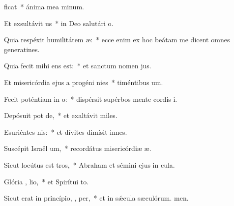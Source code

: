 \item {}ficat~* ánima mea minum.
\item Et exsultávit  us~* in Deo salutári o.
\item Quia respéxit humilitátem  æ:~* ecce enim ex hoc beátam me dicent omnes generatines.
\item Quia fecit mihi   ens est:~* et sanctum nomen jus.
\item Et misericórdia ejus a progéni  nies~* timéntibus um.
\item Fecit poténtiam in  o:~* dispérsit supérbos mente cordis i.
\item Depósuit pot  de,~* et exaltávit miles.
\item Esuriéntes  nis:~* et dívites dimísit innes.
\item Suscépit Israël  um,~* recordátus misericórdiæ æ.
\item Sicut locútus est   tros,~* Abraham et sémini ejus in cula.
\item Glória ,  lio,~* et Spirítui to.
\item Sicut erat in princípio,  ,  per,~* et in sǽcula sæculórum. men.
